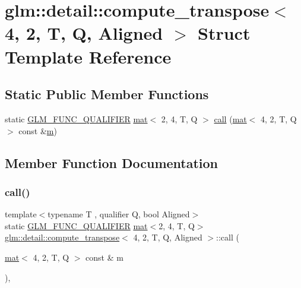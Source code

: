 \hypertarget{structglm_1_1detail_1_1compute__transpose_3_014_00_012_00_01_t_00_01_q_00_01_aligned_01_4}{}\section{glm\+:\+:detail\+:\+:compute\+\_\+transpose$<$ 4, 2, T, Q, Aligned $>$ Struct Template Reference}
\label{structglm_1_1detail_1_1compute__transpose_3_014_00_012_00_01_t_00_01_q_00_01_aligned_01_4}
\subsection*{Static Public Member Functions}
\begin{DoxyCompactItemize}
\item 
static \mbox{\hyperlink{setup_8hpp_a33fdea6f91c5f834105f7415e2a64407}{G\+L\+M\+\_\+\+F\+U\+N\+C\+\_\+\+Q\+U\+A\+L\+I\+F\+I\+ER}} \mbox{\hyperlink{structglm_1_1mat}{mat}}$<$ 2, 4, T, Q $>$ \mbox{\hyperlink{structglm_1_1detail_1_1compute__transpose_3_014_00_012_00_01_t_00_01_q_00_01_aligned_01_4_a5e13270991a1ebde3bd571f789996db8}{call}} (\mbox{\hyperlink{structglm_1_1mat}{mat}}$<$ 4, 2, T, Q $>$ const \&\mbox{\hyperlink{_s_d_l__opengl__glext_8h_af593500c283bf1a787a6f947f503a5c2}{m}})
\end{DoxyCompactItemize}


\subsection{Member Function Documentation}
\mbox{\label{structglm_1_1detail_1_1compute__transpose_3_014_00_012_00_01_t_00_01_q_00_01_aligned_01_4_a5e13270991a1ebde3bd571f789996db8}} 
\subsubsection{\texorpdfstring{call()}{call()}}
{\footnotesize\ttfamily template$<$typename T , qualifier Q, bool Aligned$>$ \\
static \mbox{\hyperlink{setup_8hpp_a33fdea6f91c5f834105f7415e2a64407}{G\+L\+M\+\_\+\+F\+U\+N\+C\+\_\+\+Q\+U\+A\+L\+I\+F\+I\+ER}} \mbox{\hyperlink{structglm_1_1mat}{mat}}$<$2, 4, T, Q$>$ \mbox{\hyperlink{structglm_1_1detail_1_1compute__transpose}{glm\+::detail\+::compute\+\_\+transpose}}$<$ 4, 2, T, Q, Aligned $>$\+::call (\begin{DoxyParamCaption}\item[{\mbox{\hyperlink{structglm_1_1mat}{mat}}$<$ 4, 2, T, Q $>$ const \&}]{m }\end{DoxyParamCaption})\hspace{0.3cm}{\ttfamily [inline]}, {\ttfamily [static]}}



